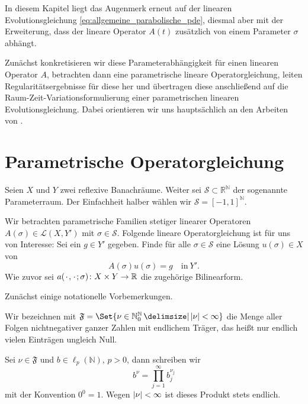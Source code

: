 In diesem Kapitel liegt das Augenmerk erneut auf der linearen Evolutionsgleichung \eqref{eq:allgemeine_parabolische_pde}, diesmal aber mit der Erweiterung, dass der lineare Operator $A(t)$ zusätzlich von einem Parameter $\sigma$ abhängt.

Zunächst konkretisieren wir diese Parameterabhängigkeit für einen linearen Operator $A$, betrachten dann eine parametrische lineare Operatorgleichung, leiten Regularitätsergebnisse für diese her und übertragen diese anschließend auf die Raum-Zeit-Variationsformulierung einer parametrischen linearen Evolutionsgleichung.
Dabei orientieren wir uns hauptsächlich an den Arbeiten von \textcite{Kunoth:2013ef,Cohen:2010kz}.

\section{Parametrische Operatorgleichung} %
\label{sec:parametrische_operatorgleichung}

Seien $X$ und $Y$ zwei reflexive Banachräume.
Weiter sei $\mathcal S \subset \mathbb{R}^{\mathbb{N}}$ der sogenannte Parameterraum.
Der Einfachheit halber wählen wir $\mathcal S = [-1, 1]^{\mathbb{N}}$.

Wir betrachten parametrische Familien stetiger linearer Operatoren $A(\sigma) \in \mathcal L(X, Y')$ mit $\sigma \in \mathcal S$.
Folgende lineare Operatorgleichung ist für uns von Interesse:
Sei ein $g \in Y'$ gegeben.
Finde für alle $\sigma \in \mathcal S$ eine Lösung $u(\sigma) \in X$ von
\begin{equation}
    \label{eq:allgemeine_parametrische_elliptische_pde}
    A(\sigma) u(\sigma) = g \quad \text{in}~Y'.
\end{equation}
Wie zuvor sei $a({\mkern2mu\cdot\mkern2mu}, {\mkern2mu\cdot\mkern2mu}; \sigma) \colon X \times Y \to \mathbb{R}$ die zugehörige Bilinearform.

Zunächst einige notationelle Vorbemerkungen.
\begin{Bemerkung}
    Wir bezeichnen mit $\mathfrak F = \Set{ \nu \in \mathbb{N}^{\mathbb{N}}_{0} \given \abs{\nu} < \infty }$ die Menge aller Folgen nichtnegativer ganzer Zahlen mit endlichem Träger, das heißt nur endlich vielen Einträgen ungleich Null.

    Sei $\nu \in \mathfrak F$ und $b \in \ell_{p}(\mathbb{N})$, $p > 0$, dann schreiben wir
    \begin{equation}
        b^{\nu} = \prod_{j = 1}^{\infty} b_{j}^{\nu_{j}}
    \end{equation}
    mit der Konvention $0^{0} = 1$.
    Wegen $\lvert\nu\rvert < \infty$ ist dieses Produkt stets endlich.
\end{Bemerkung}

